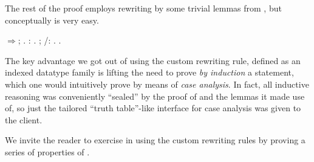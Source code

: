 \coqdocemptyline


The rest of the proof employs rewriting by some trivial lemmas from
,  but conceptually is very easy.


\begin{coqdoccode}
\coqdocemptyline
\coqdocnoindent
{}\ensuremath{\Rightarrow}; .\coqdoceol
\coqdocnoindent
{} : .\coqdoceol
\coqdocnoindent
{}    ; /: .\coqdoceol
\coqdocnoindent
{}.\coqdoceol
\coqdocemptyline
\end{coqdoccode}


The key advantage we got out of using the custom rewriting rule,
defined as an indexed datatype family is lifting the need to prove \textit{by
induction} a statement, which one would intuitively prove by means of
\textit{case analysis}. In fact, all inductive reasoning was conveniently
``sealed'' by the proof of  and the lemmas it made use of, so just
the tailored ``truth table''-like interface for case analysis was given
to the client.


We invite the reader to exercise in using the custom rewriting rules
by proving a series of properties of .


